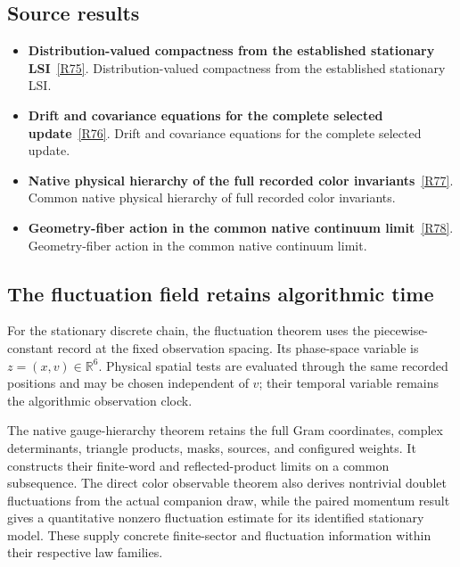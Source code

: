 \documentclass[11pt,a4paper]{article}
\begin{document}
\subsection*{Source results}
\begin{itemize}
\item \textbf{Distribution-valued compactness from the established stationary LSI}~\hyperref[src:thm-ym-spacetime-fluctuation-compactness]{[R75]}. Distribution-valued compactness from the established stationary LSI.
\item \textbf{Drift and covariance equations for the complete selected update}~\hyperref[src:prop-ym-complete-fluctuation-equations]{[R76]}. Drift and covariance equations for the complete selected update.
\item \textbf{Native physical hierarchy of the full recorded color invariants}~\hyperref[src:thm-ym-native-physical-gauge-hierarchy]{[R77]}. Common native physical hierarchy of full recorded color invariants.
\item \textbf{Geometry-fiber action in the common native continuum limit}~\hyperref[src:thm-ym-native-fiber-continuum]{[R78]}. Geometry-fiber action in the common native continuum limit.
\end{itemize}
\subsection*{The fluctuation field retains algorithmic time}
For the stationary discrete chain, the fluctuation theorem uses the piecewise-constant record at the fixed observation spacing. Its phase-space variable is \(z=(x,v)\in\mathbb R^6\). Physical spatial tests are evaluated through the same recorded positions and may be chosen independent of \(v\); their temporal variable remains the algorithmic observation clock.

The native gauge-hierarchy theorem retains the full Gram coordinates, complex determinants, triangle products, masks, sources, and configured weights. It constructs their finite-word and reflected-product limits on a common subsequence. The direct color observable theorem also derives nontrivial doublet fluctuations from the actual companion draw, while the paired momentum result gives a quantitative nonzero fluctuation estimate for its identified stationary model. These supply concrete finite-sector and fluctuation information within their respective law families.
\end{document}
